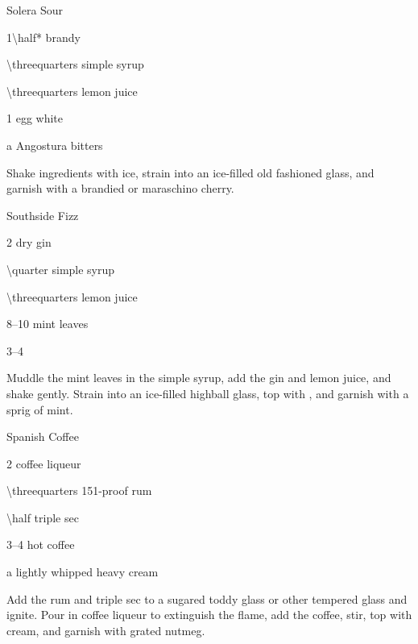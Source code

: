 \begin{Cocktail}{Solera Sour}
	\begin{Ingredients}
	\item \SI{1\half*}{\oz} brandy
	\item \SI{\threequarters}{\oz} simple syrup
	\item \SI{\threequarters}{\oz} lemon juice
	\item 1 egg white
	\item a \si{\dash} Angostura bitters
	\end{Ingredients}
	
	\begin{Instructions}
	Shake ingredients with ice, strain into an ice-filled old fashioned glass, and garnish with a brandied or maraschino cherry.
	\end{Instructions}
\end{Cocktail}

\begin{Cocktail}{Southside Fizz}
	\begin{Ingredients}
	\item \SI{2}{\oz} dry gin
	\item \SI{\quarter}{\oz} simple syrup
	\item \SI{\threequarters}{\oz} lemon juice
	\item \numrange{8}{10} mint leaves
	\item \SIrange{3}{4}{\oz} \soda\/
	\end{Ingredients}
	
	\begin{Instructions}
	Muddle the mint leaves in the simple syrup, add the gin and lemon juice, and shake gently.  Strain into an ice-filled highball glass, top with \soda\/, and garnish with a sprig of mint.
	\end{Instructions}
\end{Cocktail}

\begin{Cocktail}{Spanish Coffee}
	\begin{Ingredients}
	\item \SI{2}{\oz} coffee liqueur
	\item \SI{\threequarters}{\oz} 151-proof rum
	\item \SI{\half}{\oz} triple sec
	\item \SIrange{3}{4}{\oz} hot coffee
	\item a \si{\splash} lightly whipped heavy cream
	\end{Ingredients}
	
	\begin{Instructions}
	Add the rum and triple sec to a sugared toddy glass or other tempered glass and ignite.  Pour in coffee liqueur to extinguish the flame, add the coffee, stir, top with cream, and garnish with grated nutmeg.
	\end{Instructions}
\end{Cocktail}

